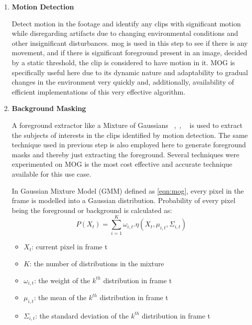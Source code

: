 \begin{enumerate}
    \item \textbf{Motion Detection}

    Detect motion in the footage and identify any clips with significant motion
    while disregarding artifacts due to changing environmental conditions and
    other insignificant disturbances.
    \gls{mog} is used in this step to see if there is any movement, and if there is
    significant foreground present in an image, decided by a static threshold,
    the clip is considered to have motion in it. MOG is specifically useful here
    due to its dynamic nature and adaptability to gradual changes in the
    environment very quickly and, additionally, availability of efficient
    implementations of this very effective algorithm.

    \item \textbf{Background Masking}

    A foreground extractor like a Mixture of Gaussians~
    \cite{zivkovic2004improved},~\cite{bouttefroy2010analysis},
    ~\cite{sun2006background} is used to extract the subjects of interests in
    the clips identified by motion detection. The same technique used in
    previous step is also employed here to generate foreground masks and
    thereby just extracting the foreground. Several techniques were
    experimented on MOG is the most cost effective
    and accurate technique available for this use case.

    In Gaussian Mixture Model (GMM) defined as \ref{eqn:mog}, every pixel in the frame is modelled into
    a Gaussian distribution. Probability of every pixel being the foreground or
    background is calculated as:
    \begin{equation}\label{eqn:mog}
    P\left(X_{t}\right) =
    \sum_{i=1}^{K} \omega_{i,t}.\eta(X_{t},\mu_{i,t},\Sigma_{i,t})
    \end{equation}

    \begin{itemize}
        \item \(X_{t}\): current pixel in frame t
        \item \(K\): the number of distributions in the mixture
        \item \(\omega_{i,t}\): the weight of the \(k^{th}\) distribution in frame t
        \item \(\mu_{i,t}\): the mean of the \(k^{th}\) distribution in frame t
        \item \(\Sigma_{i,t}\): the standard deviation of the \(k^{th}\)
        distribution in frame t
    \end{itemize}


\end{enumerate}
